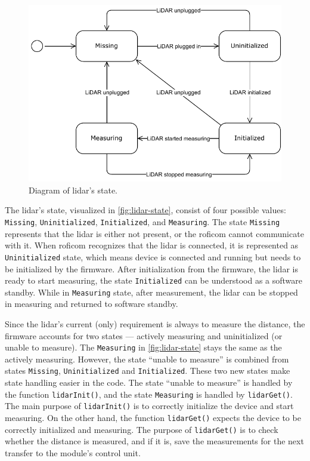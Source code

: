 \documentclass[
  digital,     %
  oneside,     %
  nosansbold,  %
  nocolorbold, %
  nolof,         %
  nolot,         %
]{fithesis4}
\begin{document}
\begin{figure}[h!]
    \includegraphics[width=\textwidth,height=\textheight,keepaspectratio]{assets/lidar-state.pdf}
    \caption[Diagram of \acrshort{lidar}'s state]{Diagram of \acrshort{lidar}'s state.}
    \label{fig:lidar-state}
\end{figure}

The \acrshort{lidar}'s state, visualized in \autoref{fig:lidar-state}, consist of four possible
values: \texttt{Missing}, \texttt{Uninitialized}, \texttt{Initialized}, and \texttt{Measuring}. The
state \texttt{Missing} represents that the \acrshort{lidar} is either not present, or the
\acrshort{roficom} cannot communicate with it. When \acrshort{roficom} recognizes that the
\acrshort{lidar} is connected, it is represented as \texttt{Uninitialized} state, which means device
is connected and running but needs to be initialized by the firmware. After initialization from the
firmware, the \acrshort{lidar} is ready to start measuring, the state \texttt{Initialized} can be
understood as a software standby. While in \texttt{Measuring} state, after measurement, the
\acrshort{lidar} can be stopped in measuring and returned to software standby.

Since the \acrshort{lidar}'s current (only) requirement is always to measure the distance, the
firmware accounts for two states --- actively measuring and uninitialized (or unable to measure).
The \verb|Measuring| in \autoref{fig:lidar-state} stays the same as the actively measuring. However,
the state ``unable to measure'' is combined from states \verb|Missing|, \verb|Uninitialized| and
\verb|Initialized|. These two new states make state handling easier in the code. The state ``unable
to measure'' is handled by the function \lstinline|lidarInit()|, and the state \verb|Measuring| is
handled by \lstinline|lidarGet()|. The main purpose of \lstinline|lidarInit()| is to correctly
initialize the device and start measuring. On the other hand, the function \lstinline|lidarGet()|
expects the device to be correctly initialized and measuring. The purpose of \lstinline|lidarGet()|
is to check whether the distance is measured, and if it is, save the measurements for the next
transfer to the module's control unit.
\end{document}
